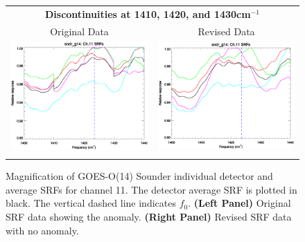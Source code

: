 \begin{figure}[htp]
  \centering
  \begin{tabular}{c c}
    \multicolumn{2}{c}{\textsf{\bfseries Discontinuities at 1410, 1420, and 1430cm$^{-1}$}} \\
    \hspace{1.5em}\textsf{Original Data} &
    \hspace{1.5em}\textsf{Revised Data} \\
    \includegraphics[scale=0.5,trim=0 40 0 0]{graphics/zoom_anomaly/original/sndr_g14.ch11.srf.eps} &
    \includegraphics[scale=0.5,trim=0 40 0 0]{graphics/zoom_anomaly/revised/sndr_g14.ch11.srf.eps} \\\\
  \end{tabular}
  \caption{Magnification of GOES-O(14) Sounder individual detector and average SRFs for channel 11. The detector average SRF is plotted in black. The vertical dashed line indicates $f_0$. \textbf{(Left Panel)} Original SRF data showing the anomaly. \textbf{(Right Panel)} Revised SRF data with no anomaly.}
  \label{fig:sndr_g14.ch11.anomaly}
\end{figure}

